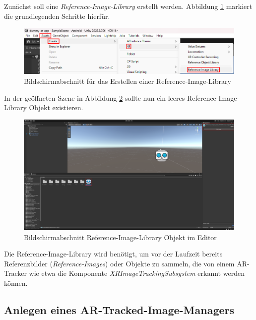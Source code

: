 Zunächst soll eine \textit{Reference-Image-Library} erstellt werden. Abbildung \ref{fig:implementierung:unity:AR-Create-Img-Lib} markiert die grundlegenden Schritte hierfür.

\begin{figure}[H]
    \centering
    \includegraphics[width=\textwidth]{images/PrAr_UnityAR-Create-Img-Lib.png}
    \caption{Bildschirmabschnitt für das Erstellen einer Reference-Image-Library}
    \label{fig:implementierung:unity:AR-Create-Img-Lib}
\end{figure}

In der geöffneten Szene in Abbildung \ref{fig:implementierung:unity:AR-See-Img-Lib} sollte nun ein leeres Reference-Image-Library Objekt existieren.

\begin{figure}[H]
    \centering
    \includegraphics[width=\textwidth]{images/PrAr_UnityAR-See-Img-lib.png}
    \caption{Bildschirmabschnitt Reference-Image-Library Objekt im Editor}
    \label{fig:implementierung:unity:AR-See-Img-Lib}
\end{figure}

Die Reference-Image-Library wird benötigt, um vor der Laufzeit bereits Referenzbilder (\textit{Reference-Images}) oder Objekte zu sammeln, die von einem AR-Tracker wie etwa die Komponente \textit{XRImageTrackingSubsystem} erkannt werden können.

\subsection{Anlegen eines AR-Tracked-Image-Managers}

